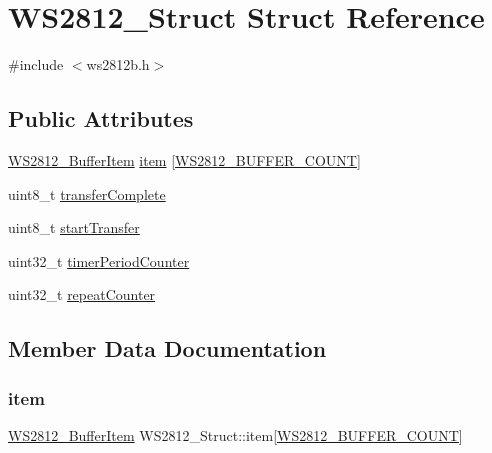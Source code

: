 \hypertarget{structWS2812__Struct}{}\section{W\+S2812\+\_\+\+Struct Struct Reference}
\label{structWS2812__Struct}


{\ttfamily \#include $<$ws2812b.\+h$>$}

\subsection*{Public Attributes}
\begin{DoxyCompactItemize}
\item 
\hyperlink{structWS2812__BufferItem}{W\+S2812\+\_\+\+Buffer\+Item} \hyperlink{structWS2812__Struct_a6cd2d43f1a8f7db85c358832afa4b1a4}{item} \mbox{[}\hyperlink{ws2812b_8h_ae073315a6ff566e89bed1ddce72eeaf2}{W\+S2812\+\_\+\+B\+U\+F\+F\+E\+R\+\_\+\+C\+O\+U\+NT}\mbox{]}
\item 
uint8\+\_\+t \hyperlink{structWS2812__Struct_a76b812e4e2594198498fbbb450cb7573}{transfer\+Complete}
\item 
uint8\+\_\+t \hyperlink{structWS2812__Struct_a8a2808a63ab3b626681ddb243b8fa3b8}{start\+Transfer}
\item 
uint32\+\_\+t \hyperlink{structWS2812__Struct_a0fca7f88619192dadbd8ff7d1a86a8ba}{timer\+Period\+Counter}
\item 
uint32\+\_\+t \hyperlink{structWS2812__Struct_abe9830693127f542e73325e82d213769}{repeat\+Counter}
\end{DoxyCompactItemize}


\subsection{Member Data Documentation}
\mbox{\label{structWS2812__Struct_a6cd2d43f1a8f7db85c358832afa4b1a4}} 
\subsubsection{\texorpdfstring{item}{item}}
{\footnotesize\ttfamily \hyperlink{structWS2812__BufferItem}{W\+S2812\+\_\+\+Buffer\+Item} W\+S2812\+\_\+\+Struct\+::item\mbox{[}\hyperlink{ws2812b_8h_ae073315a6ff566e89bed1ddce72eeaf2}{W\+S2812\+\_\+\+B\+U\+F\+F\+E\+R\+\_\+\+C\+O\+U\+NT}\mbox{]}}

